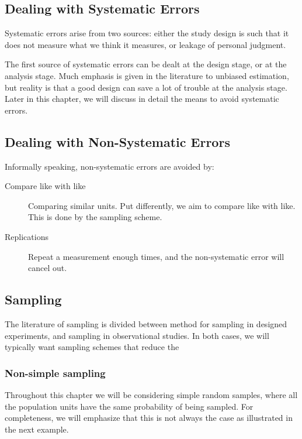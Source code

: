 \subsection{Dealing with Systematic Errors}

Systematic errors arise from two sources: either the study design is such that it does not measure what we think it measures, or leakage of personal judgment.

The first source of systematic errors can be dealt at the design stage, or at the analysis stage.
Much emphasis is given in the literature to unbiased estimation, but reality is that a good design can save a lot of trouble at the analysis stage. 
Later in this chapter, we will discuss in detail the means to avoid systematic errors. 


\subsection{Dealing with Non-Systematic Errors}

Informally speaking, non-systematic errors are avoided by:
\begin{description}
	\item [Compare like with like] Comparing similar units. Put differently, we aim to compare like with like. 
	This is done by the sampling scheme. 
	\item [Replications] 
	Repeat a measurement enough times, and the non-systematic error will cancel out. 
\end{description} 




\subsection{Sampling}

The literature of sampling is divided between method for sampling in designed experiments, and sampling in observational studies. 
In both cases, we will typically want sampling schemes that reduce the 



\subsubsection{Non-simple sampling}
Throughout this chapter we will be considering simple random samples, where all the population units have the same probability of being sampled. 
For completeness, we will emphasize that this is not always the case as illustrated in the next example.

